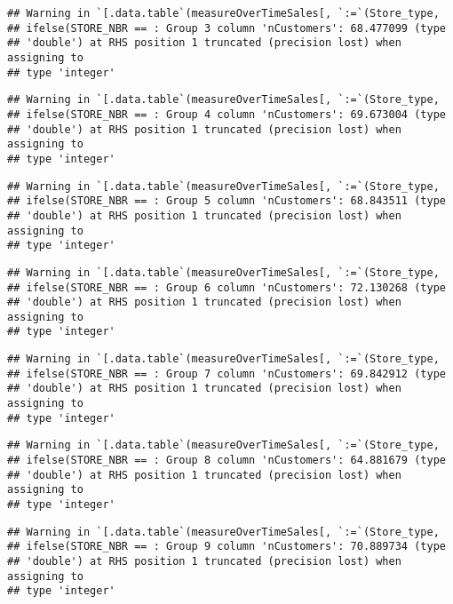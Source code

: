 \documentclass[
]{article}
\begin{document}
\begin{verbatim}
## Warning in `[.data.table`(measureOverTimeSales[, `:=`(Store_type,
## ifelse(STORE_NBR == : Group 3 column 'nCustomers': 68.477099 (type
## 'double') at RHS position 1 truncated (precision lost) when assigning to
## type 'integer'
\end{verbatim}

\begin{verbatim}
## Warning in `[.data.table`(measureOverTimeSales[, `:=`(Store_type,
## ifelse(STORE_NBR == : Group 4 column 'nCustomers': 69.673004 (type
## 'double') at RHS position 1 truncated (precision lost) when assigning to
## type 'integer'
\end{verbatim}

\begin{verbatim}
## Warning in `[.data.table`(measureOverTimeSales[, `:=`(Store_type,
## ifelse(STORE_NBR == : Group 5 column 'nCustomers': 68.843511 (type
## 'double') at RHS position 1 truncated (precision lost) when assigning to
## type 'integer'
\end{verbatim}

\begin{verbatim}
## Warning in `[.data.table`(measureOverTimeSales[, `:=`(Store_type,
## ifelse(STORE_NBR == : Group 6 column 'nCustomers': 72.130268 (type
## 'double') at RHS position 1 truncated (precision lost) when assigning to
## type 'integer'
\end{verbatim}

\begin{verbatim}
## Warning in `[.data.table`(measureOverTimeSales[, `:=`(Store_type,
## ifelse(STORE_NBR == : Group 7 column 'nCustomers': 69.842912 (type
## 'double') at RHS position 1 truncated (precision lost) when assigning to
## type 'integer'
\end{verbatim}

\begin{verbatim}
## Warning in `[.data.table`(measureOverTimeSales[, `:=`(Store_type,
## ifelse(STORE_NBR == : Group 8 column 'nCustomers': 64.881679 (type
## 'double') at RHS position 1 truncated (precision lost) when assigning to
## type 'integer'
\end{verbatim}

\begin{verbatim}
## Warning in `[.data.table`(measureOverTimeSales[, `:=`(Store_type,
## ifelse(STORE_NBR == : Group 9 column 'nCustomers': 70.889734 (type
## 'double') at RHS position 1 truncated (precision lost) when assigning to
## type 'integer'
\end{verbatim}
\end{document}

